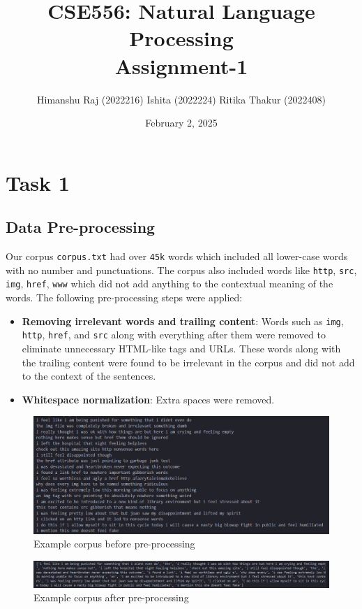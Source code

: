 \documentclass{article}
\title{CSE556: Natural Language Processing \\ Assignment-1}
\author{Himanshu Raj (2022216) \textbar{} Ishita (2022224) \textbar{} Ritika Thakur (2022408) }
\date{February 2, 2025}
\begin{document}
\maketitle

\section{Task 1}
\subsection{Data Pre-processing}
Our corpus \texttt{corpus.txt} had over \texttt{45k} words which included all lower-case words with no number and punctuations. The corpus also included words like \texttt{http}, \texttt{src}, \texttt{img}, \texttt{href}, \texttt{www} which did not add anything to the contextual meaning of the words.
The following pre-processing steps were applied:
\begin{itemize}
\item \textbf{Removing irrelevant words and trailing content}: Words such as \texttt{img}, \texttt{http}, \texttt{href}, and \texttt{src} along with everything after them were removed to eliminate unnecessary HTML-like tags and URLs. These words along with the trailing content were found to be irrelevant in the corpus and did not add to the context of the sentences.
\item \textbf{Whitespace normalization}: Extra spaces were removed.
\end{itemize}

\begin{figure}[H]
    \centering
    \includegraphics[width=0.75\linewidth]{image1.png}
    \caption{Example corpus before pre-processing}
    \label{fig:enter-task1}
\end{figure}
\begin{figure}[H]
    \centering
    \includegraphics[width=0.75\linewidth]{image2.png}
    \caption{Example corpus after pre-processing}
    \label{fig:enter-task1}
\end{figure}
\end{document}
